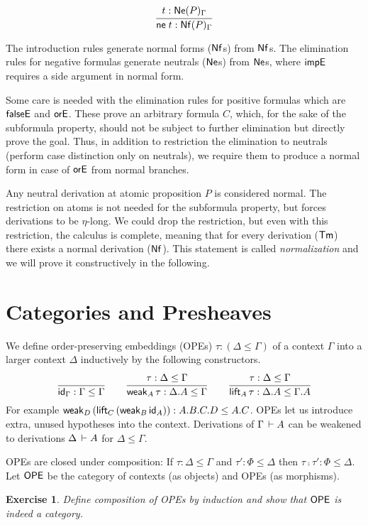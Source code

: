 \documentclass[a4paper]{article}
\newtheorem{exercise}[theorem]{Exercise}
\begin{document}
\[
  \ru{t : \NeG P
    }{\neu t : \NfG P}
\]

The introduction rules generate normal forms ($\tNf$s) from $\tNf$s.  The elimination
rules for negative formulas generate neutrals ($\tNe$s) from $\tNe$s, where
$\timpE$ requires a side argument in normal form.

Some care is needed with  the elimination rules for
positive formulas which are $\tfalseE$ and $\torE$.
These prove an arbitrary formula $C$, which, for the sake of the
subformula property, should not be subject to
further elimination but directly prove the goal.
Thus, in addition to restriction the elimination to neutrals
(perform case distinction only on neutrals),
we require them to produce a normal form
in case of $\torE$ from normal branches.

Any neutral derivation at atomic proposition $P$ is considered normal.
The restriction on atoms is not needed for the subformula property,
but forces derivations to be $\eta$-long.
We could drop the restriction, but even with this restriction, the
calculus is complete, meaning that for every derivation ($\tTm$) there
exists a normal derivation ($\tNf$).  This statement is called
\emph{normalization} and we will prove it constructively in the
following.


\section{Categories and Presheaves}

We define order-preserving embeddings (OPEs) $\tau : (\Delta \leq \Gamma)$ of a
context $\Gamma$ into a larger context $\Delta$ inductively by the
following constructors.
\begin{gather*}
  \ru{}{\id[\Gamma] : \Gamma \leq \Gamma}
\qquad
  \ru{\tau : \Delta \leq \Gamma
    }{\weak[A] \tau : \Delta.A \leq \Gamma}
\qquad
  \ru{\tau : \Delta \leq \Gamma
    }{\lift[A] \tau : \Delta.A \leq \Gamma.A}
\end{gather*}
For example $\weak [D] (\lift[C] (\weak[B] \id[A])) : A.B.C.D \leq
A.C$.  OPEs let us introduce extra, unused hypotheses into the
context.  Derivations of $\Gamma \der A$ can be weakened to
derivations $\Delta \der A$ for $\Delta \leq \Gamma$.

OPEs are closed under composition:  If $\tau : \Delta \leq \Gamma$ and
$\tau' : \Phi \leq \Delta$ then $\tau \comp \tau' : \Phi \leq \Delta$.
Let $\OPE$ be the category of contexts (as objects) and OPEs (as morphisms).
\begin{exercise}
  Define composition of OPEs by induction and show that $\OPE$ is
  indeed a category.
\end{exercise}
\end{document}
